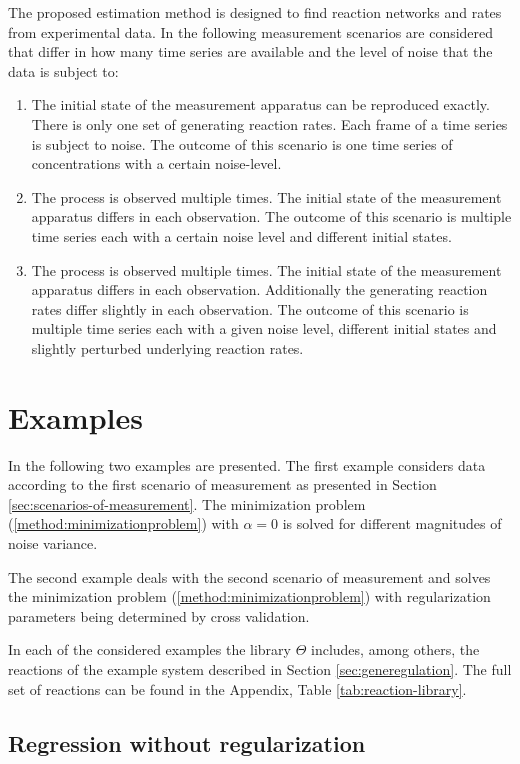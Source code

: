 \documentclass[oneside, abstracton, titlepage]{scrartcl}
\begin{document}
    The proposed estimation method is designed to find reaction networks and rates from experimental data. In the following measurement scenarios are considered that differ in how many time series are available and the level of noise that the data is subject to:
    \begin{enumerate}
        \item The initial state of the measurement apparatus can be reproduced exactly. There is only one set of generating reaction rates. Each frame of a time series is subject to noise. The outcome of this scenario is one time series of concentrations with a certain noise-level.
        \item The process is observed multiple times. The initial state of the measurement apparatus differs in each observation. The outcome of this scenario is multiple time series each with a certain noise level and different initial states.
        \item The process is observed multiple times. The initial state of the measurement apparatus differs in each observation. Additionally the generating reaction rates differ slightly in each observation. The outcome of this scenario is multiple time series each with a given noise level, different initial states and slightly perturbed underlying reaction rates.
    \end{enumerate}


	\section{Examples}\label{sec:examples}

	In the following two examples are presented. The first example considers data according to the first scenario of measurement as presented in Section \ref{sec:scenarios-of-measurement}.
	The minimization problem (\ref{method:minimizationproblem}) with $\alpha=0$ is solved for different magnitudes of noise variance.
	
	The second example deals with the second scenario of measurement and solves the minimization problem (\ref{method:minimizationproblem}) with regularization parameters being determined by cross validation.
	
	In each of the considered examples the library $\Theta$ includes, among others, the reactions of the example system described in Section \ref{sec:generegulation}. The full set of reactions can be found in the Appendix, Table \ref{tab:reaction-library}.

	\subsection{Regression without regularization}
	\label{sec:ex1}
\end{document}
